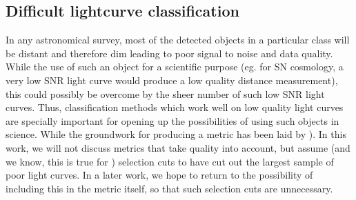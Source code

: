 \subsection{Difficult lightcurve classification}
\label{sec:difficult}

In any astronomical survey, most of the detected objects in a particular class will be distant and therefore dim leading to poor signal to noise and data quality.
While the use of such an object for a scientific purpose (eg. for SN cosmology, a very low SNR light curve would produce a low quality distance measurement), this could possibly be overcome by the sheer number of such low SNR light curves.
Thus, classification methods which
work well on low quality light curves are specially important for opening up the possibilities of using such objects in science. While the groundwork for producing a metric has been laid by \cite{wu_radio_2018}).
In this work, we will not discuss metrics that take quality into account, but assume (and we know, this is true for \plasticc) selection cuts to have cut out the largest  sample of poor light curves.
In a later work, we hope to return to the possibility of including this in the metric itself, so that such selection cuts are unnecessary.
